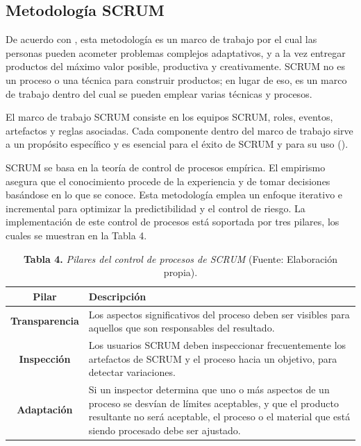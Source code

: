 		\subsection{Metodolog\'{i}a SCRUM}
De acuerdo con \cite{Schwaber&Sutherland}, esta metodolog\'{i}a es un marco de trabajo por el cual las personas pueden acometer problemas complejos adaptativos, y a la vez entregar productos del m\'{a}ximo valor posible, productiva y creativamente. SCRUM no es un proceso o una t\'{e}cnica para construir productos; en lugar de eso, es un marco de trabajo dentro del cual se pueden emplear varias t\'{e}cnicas y procesos. 
			
		\newpage			
			
El marco de trabajo SCRUM consiste en los equipos SCRUM, roles, eventos, artefactos y reglas asociadas. Cada componente dentro del marco de trabajo sirve a un prop\'{o}sito espec\'{i}fico y es esencial para el \'{e}xito de SCRUM y para su uso (\cite{Schwaber&Sutherland}).

SCRUM se basa en la teor\'{i}a de control de procesos emp\'{i}rica. El empirismo asegura 	que el conocimiento procede de la experiencia y de tomar decisiones bas\'{a}ndose en lo que se conoce. Esta metodolog\'{i}a emplea un enfoque iterativo e incremental para optimizar la predictibilidad y el control de riesgo. La implementaci\'{o}n de este control de procesos est\'{a} soportada por tres pilares, los cuales se muestran en la Tabla 4.
			
			\begin{table}[htb]
				\small
				\centering
				\setlength{\extrarowheight}{5pt}
				\begin{tabulary}{15cm}{|c|L|}
					\hline
					\textbf{Pilar} & \textbf{Descripci\'{o}n}\\ \hline
					\textbf{Transparencia} & Los aspectos significativos del proceso deben ser visibles para aquellos que son responsables del resultado.\\ \hline
					\textbf{Inspecci\'{o}n} & Los usuarios SCRUM deben inspeccionar frecuentemente los artefactos de SCRUM y el proceso hacia un objetivo, para detectar variaciones.\\ \hline
					\textbf{Adaptaci\'{o}n} & Si un inspector determina que uno o m\'{a}s aspectos de un proceso se desv\'{i}an de l\'{i}mites aceptables, y que el producto resultante no ser\'{a} aceptable, el proceso o el material que est\'{a} siendo procesado debe ser ajustado.\\ \hline
			\end{tabulary}
			\caption{\textbf{Tabla 4.} \textit{Pilares del control de procesos de SCRUM} (Fuente: Elaboraci\'{o}n propia).}
			\end{table}
			\newpage
			
